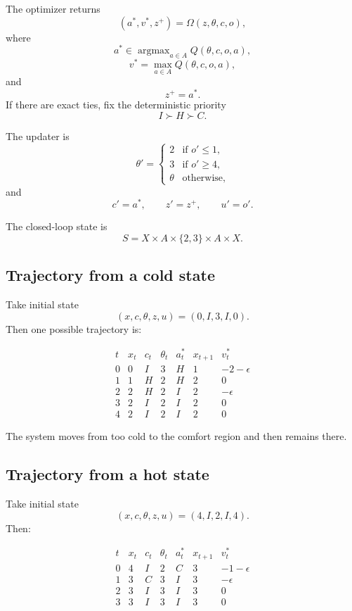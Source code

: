 The optimizer returns
\[
(a^*,v^*,z^+)=\Omega(z,\theta,c,o),
\]
where
\[
a^*\in \operatorname{argmax}_{a\in A}Q(\theta,c,o,a),
\]
\[
v^*=\max_{a\in A}Q(\theta,c,o,a),
\]
and
\[
z^+=a^*.
\]
If there are exact ties, fix the deterministic priority
\[
I\succ H\succ C.
\]

The updater is
\[
\theta'=
\begin{cases}
2 & \text{if } o'\leq 1,\\
3 & \text{if } o'\geq 4,\\
\theta & \text{otherwise},
\end{cases}
\]
and
\[
c'=a^*,
\qquad
z'=z^+,
\qquad
u'=o'.
\]

The closed-loop state is
\[
S=X\times A\times \{2,3\}\times A\times X.
\]

\subsection{Trajectory from a cold state}
\label{subsec:thermostat-cold-trajectory}

Take initial state
\[
(x,c,\theta,z,u)=(0,I,3,I,0).
\]
Then one possible trajectory is:

\[
\begin{array}{c|c|c|c|c|c|c}
t & x_t & c_t & \theta_t & a_t^* & x_{t+1} & v_t^* \\
\hline
0 & 0 & I & 3 & H & 1 & -2-\epsilon \\
1 & 1 & H & 2 & H & 2 & 0 \\
2 & 2 & H & 2 & I & 2 & -\epsilon \\
3 & 2 & I & 2 & I & 2 & 0 \\
4 & 2 & I & 2 & I & 2 & 0
\end{array}
\]

The system moves from too cold to the comfort region and then remains there.

\subsection{Trajectory from a hot state}
\label{subsec:thermostat-hot-trajectory}

Take initial state
\[
(x,c,\theta,z,u)=(4,I,2,I,4).
\]
Then:

\[
\begin{array}{c|c|c|c|c|c|c}
t & x_t & c_t & \theta_t & a_t^* & x_{t+1} & v_t^* \\
\hline
0 & 4 & I & 2 & C & 3 & -1-\epsilon \\
1 & 3 & C & 3 & I & 3 & -\epsilon \\
2 & 3 & I & 3 & I & 3 & 0 \\
3 & 3 & I & 3 & I & 3 & 0
\end{array}
\]

